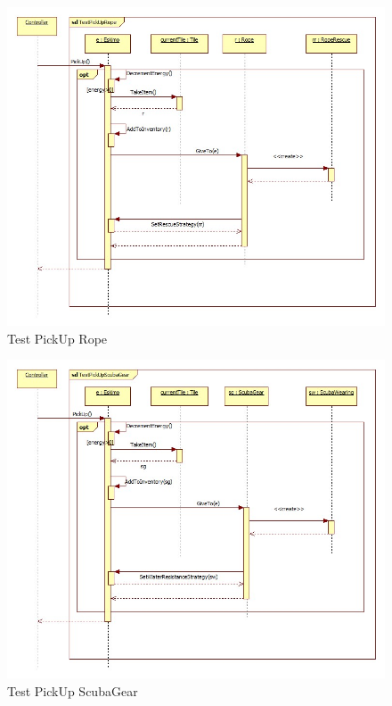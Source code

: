 \begin{figure}[H]
	\begin{center}
		\includegraphics[width=17cm]{chapters/chapter05/diagrams/TestPickUpRope.jpg}
		\caption{Test PickUp Rope}
		\label{fig:Test PickUp Rope}
	\end{center}
\end{figure}

\begin{figure}[H]
	\begin{center}
		\includegraphics[width=17cm]{chapters/chapter05/diagrams/TestPickUpScubaGear.jpg}
		\caption{Test PickUp ScubaGear}
		\label{fig:Test PickUp ScubaGear}
	\end{center}
\end{figure}

